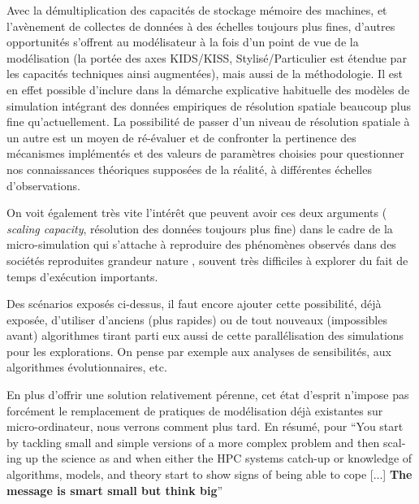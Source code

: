Avec la démultiplication des capacités de stockage mémoire des machines, et l'avènement de collectes de données à des échelles toujours plus fines, d'autres opportunités s'offrent au modélisateur à la fois d'un point de vue de la modélisation (la portée des axes KIDS/KISS, Stylisé/Particulier \autocite{Banos2013a} est étendue par les capacités techniques ainsi augmentées), mais aussi de la méthodologie. Il est en effet possible d'inclure dans la démarche explicative habituelle des modèles de simulation intégrant des données empiriques de résolution spatiale beaucoup plus fine qu'actuellement. La possibilité de passer d'un niveau de résolution spatiale à un autre est un moyen de ré-évaluer et de confronter la pertinence des mécanismes implémentés et des valeurs de paramètres choisies pour questionner nos connaissances théoriques supposées de la réalité, à différentes échelles d'observations.

On voit également très vite l'intérêt que peuvent avoir ces deux arguments ( \textit{scaling capacity}, résolution des données toujours plus fine) dans le cadre de la micro-simulation qui s'attache à reproduire des phénomènes observés dans des sociétés reproduites grandeur nature \autocite{Sanders2006}, souvent très difficiles à explorer du fait de temps d'exécution importants.

Des scénarios exposés ci-dessus, il faut encore ajouter cette possibilité, déjà exposée, d'utiliser d'anciens (plus rapides) ou de tout nouveaux (impossibles avant) algorithmes tirant parti eux aussi de cette parallélisation des simulations pour les explorations. On pense par exemple aux analyses de sensibilités, aux algorithmes évolutionnaires, etc.

En plus d'offrir une solution relativement pérenne, cet état d'esprit n'impose pas forcément le remplacement de pratiques de modélisation déjà existantes sur micro-ordinateur, nous verrons comment plus tard. En résumé, pour \textcite{Openshaw2000b} \foreignquote{english}{You start by tackling small and simple versions of a more complex problem and then scaling up the science as and when either the HPC systems catch-up or knowledge of algorithms, models, and theory start to show signs of being able to cope [...] \textbf{The message is smart small but think big}}

